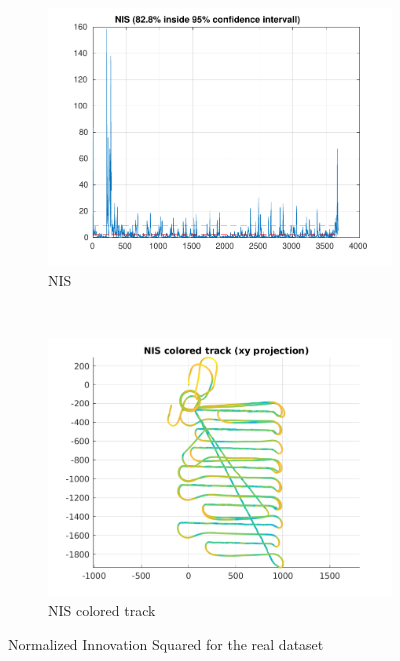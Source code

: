 \begin{figure}[H]
        \centering
        \begin{subfigure}[b]{0.45\textwidth}
                \includegraphics[width=\textwidth]{plots/a2-real-nis}
                \caption{NIS }
                \label{fig:nis_basic}
        \end{subfigure}%
~
        \begin{subfigure}[b]{0.45\textwidth}
                \includegraphics[width=\textwidth]{plots/a2-real-nis-colored-track}
                \caption{NIS colored track}
                \label{fig:nis_colored_track}
        \end{subfigure}
        \caption{Normalized Innovation Squared for the real dataset}
        \label{fig:nis}
\end{figure}


